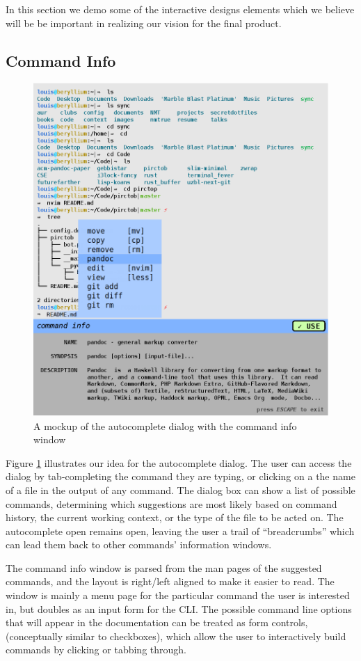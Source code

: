 In this section we demo some of the interactive designs elements which we
believe will be be important in realizing our vision for the final product.

\subsection{Command Info}

\begin{figure}[H]
  \centering
  \includegraphics[width=0.8\linewidth]{figures/interface/files.eps}
  \caption{A mockup of the autocomplete dialog with the command info window}
  \label{fig:cmdinfo}
\end{figure}

Figure \ref{fig:cmdinfo} illustrates our idea for the autocomplete dialog. The
user can access the dialog by tab-completing the command they are typing, or
clicking on a the name of a file in the output of any command. The dialog box
can show a list of possible commands, determining which suggestions are most
likely based on command history, the current working context, or the type of the
file to be acted on. The autocomplete open remains open, leaving the user a
trail of ``breadcrumbs'' which can lead them back to other commands' information
windows.

The command info window is parsed from the man pages of the suggested commands,
and the layout is right/left aligned to make it easier to read. The window is
mainly a menu page for the particular command the user is interested in, but
doubles as an input form for the CLI. The possible command line options that
will appear in the documentation can be treated as form controls, (conceptually
similar to checkboxes), which allow the user to interactively build commands by
clicking or tabbing through.

